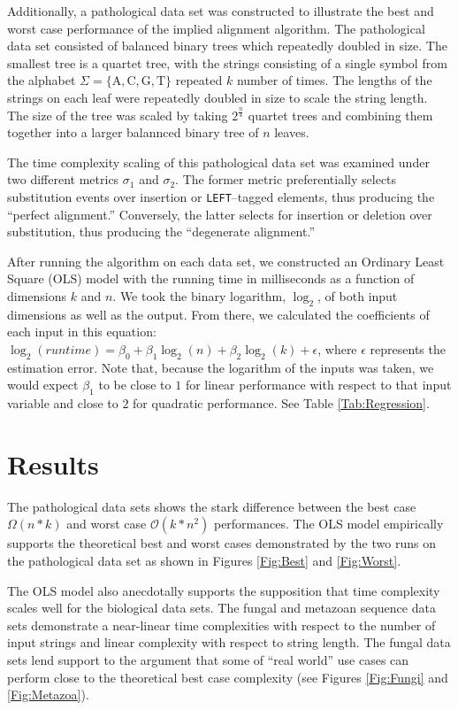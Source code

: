\documentclass{bmcart}
\begin{document}
Additionally, a pathological data set was constructed to illustrate the best and worst case performance of the implied alignment algorithm.
The pathological data set consisted of balanced binary trees which repeatedly doubled in size.
The smallest tree is a quartet tree, with the strings consisting of a single symbol from the alphabet $\Sigma = \{\mathrm{A, C, G, T}\}$ repeated $k$ number of times.
The lengths of the strings on each leaf were repeatedly doubled in size to scale the string length.
The size of the tree was scaled by taking $2^{\frac{n}{4}}$ quartet trees and combining them together into a larger balannced binary tree of $n$ leaves.

The time complexity scaling of this pathological data set was examined under two different metrics $\sigma_1$ and $\sigma_2$.
The former metric preferentially selects substitution events over insertion or \texttt{LEFT}--tagged elements, thus producing the ``perfect alignment.''
Conversely, the latter selects for insertion or deletion over substitution, thus producing the ``degenerate alignment.''


After running the algorithm on each data set, we constructed an Ordinary Least Square (OLS) model with the running time in milliseconds as a function of dimensions $k$ and $n$.
We took the binary logarithm, $\log_{2}$, of both input dimensions as well as the output.
From there, we calculated the coefficients of each input in this equation: $\log_2(runtime) = \beta_0 + \beta_1 \log_2(n) + \beta_2 \log_2(k) + \epsilon$, where $\epsilon$ represents the estimation error.
Note that, because the logarithm of the inputs was taken, we would expect $\beta_1$ to be close to $1$ for linear performance with respect to that input variable and close to $2$ for quadratic performance.
See Table \ref{Tab:Regression}.


\section*{Results}

The pathological data sets shows the stark difference between the best case $\Omega(n * k)$ and worst case $\mathcal{O}(k * n^2)$ performances.
The OLS model empirically supports the theoretical best and worst cases demonstrated by the two runs on the pathological data set as shown in Figures \ref{Fig:Best} and \ref{Fig:Worst}.

The OLS model also anecdotally supports the supposition that time complexity scales well for the biological data sets.
The fungal and metazoan sequence data sets demonstrate a near-linear time complexities with respect to the number of input strings and linear complexity with respect to string length.
The fungal data sets lend support to the argument that some of ``real world'' use cases can perform close to the theoretical best case complexity (see Figures \ref{Fig:Fungi} and \ref{Fig:Metazoa}).
\end{document}
